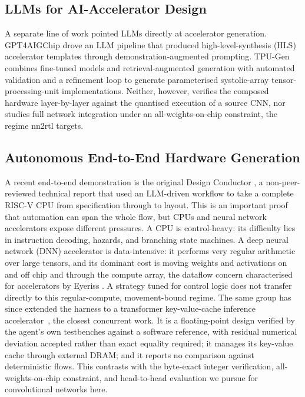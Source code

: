 \documentclass[acmtog,authorversion]{acmart}
\begin{document}
\subsection{LLMs for AI-Accelerator Design}
A separate line of work pointed LLMs directly at accelerator generation. GPT4AIGChip \cite{fu2023gpt4aigchip} drove an LLM pipeline that produced high-level-synthesis (HLS) accelerator templates through demonstration-augmented prompting. TPU-Gen \cite{vungarala2025tpugen} combines fine-tuned models and retrieval-augmented generation with automated validation and a refinement loop to generate parameterised systolic-array tensor-processing-unit implementations. Neither, however, verifies the composed hardware layer-by-layer against the quantised execution of a source CNN, nor studies full network integration under an all-weights-on-chip constraint, the regime nn2rtl targets.

\subsection{Autonomous End-to-End Hardware Generation}
A recent end-to-end demonstration is the original Design Conductor \cite{verkor2026}, a non-peer-reviewed technical report that used an LLM-driven workflow to take a complete RISC-V CPU from specification through to layout. This is an important proof that automation can span the whole flow, but CPUs and neural network accelerators expose different pressures. A CPU is control-heavy: its difficulty lies in instruction decoding, hazards, and branching state machines. A deep neural network (DNN) accelerator is data-intensive: it performs very regular arithmetic over large tensors, and its dominant cost is moving weights and activations on and off chip and through the compute array, the dataflow concern characterised for accelerators by Eyeriss \cite{chen2017}. A strategy tuned for control logic does not transfer directly to this regular-compute, movement-bound regime. The same group has since extended the harness to a transformer key-value-cache inference accelerator~\cite{verkor2026dc2}, the closest concurrent work. It is a floating-point design verified by the agent's own testbenches against a software reference, with residual numerical deviation accepted rather than exact equality required; it manages its key-value cache through external DRAM; and it reports no comparison against deterministic flows. This contrasts with the byte-exact integer verification, all-weights-on-chip constraint, and head-to-head evaluation we pursue for convolutional networks here.
\end{document}

